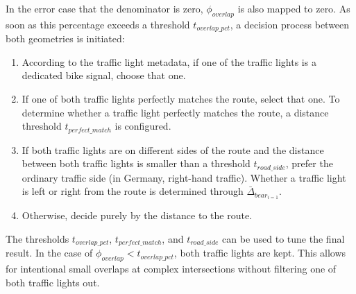 In the error case that the denominator is zero, $\phi_{overlap}$ is also mapped to zero. As soon as this percentage exceeds a threshold $t_{overlap\_pct}$, a decision process between both geometries is initiated:

\begin{enumerate}
    \item According to the traffic light metadata, if one of the traffic lights is a dedicated bike signal, choose that one.
    \item If one of both traffic lights perfectly matches the route, select that one. To determine whether a traffic light perfectly matches the route, a distance threshold $t_{perfect\_match}$ is configured.
    \item If both traffic lights are on different sides of the route and the distance between both traffic lights is smaller than a threshold $t_{road\_side}$, prefer the ordinary traffic side (in Germany, right-hand traffic). Whether a traffic light is left or right from the route is determined through $\bar{\Delta}_{bear_{i=1}}$.
    \item Otherwise, decide purely by the distance to the route.
\end{enumerate}

The thresholds $t_{overlap\_pct}$, $t_{perfect\_match}$, and $t_{road\_side}$ can be used to tune the final result. In the case of $\phi_{overlap} < t_{overlap\_pct}$, both traffic lights are kept. This allows for intentional small overlaps at complex intersections without filtering one of both traffic lights out.

